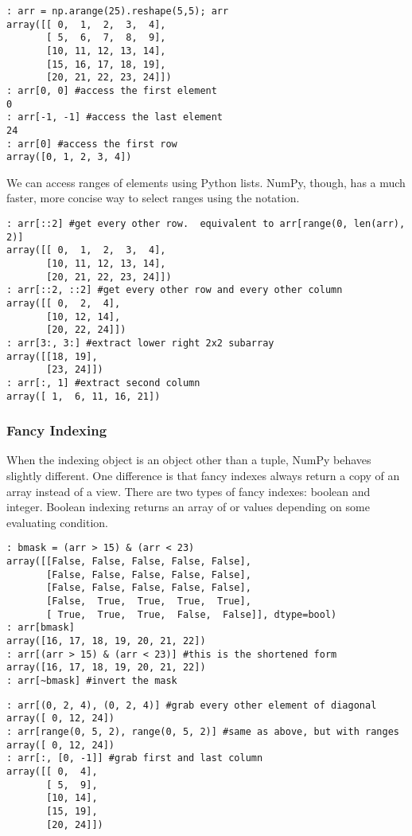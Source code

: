\begin{lstlisting}
: arr = np.arange(25).reshape(5,5); arr
array([[ 0,  1,  2,  3,  4],
       [ 5,  6,  7,  8,  9],
       [10, 11, 12, 13, 14],
       [15, 16, 17, 18, 19],
       [20, 21, 22, 23, 24]])
: arr[0, 0] #access the first element
0
: arr[-1, -1] #access the last element
24
: arr[0] #access the first row
array([0, 1, 2, 3, 4])
\end{lstlisting}
We can access ranges of elements using Python lists.  NumPy, though, has a much faster, more concise way to select ranges using the  notation.

\begin{lstlisting}
: arr[::2] #get every other row.  equivalent to arr[range(0, len(arr), 2)]
array([[ 0,  1,  2,  3,  4],
       [10, 11, 12, 13, 14],
       [20, 21, 22, 23, 24]])
: arr[::2, ::2] #get every other row and every other column
array([[ 0,  2,  4],
       [10, 12, 14],
       [20, 22, 24]])
: arr[3:, 3:] #extract lower right 2x2 subarray
array([[18, 19],
       [23, 24]])
: arr[:, 1] #extract second column
array([ 1,  6, 11, 16, 21])
\end{lstlisting}

\subsubsection*{Fancy Indexing}
When the indexing object is an object other than a tuple, NumPy behaves slightly different.  One difference is that fancy indexes always return a copy of an array instead of a view.  There are two types of fancy indexes: boolean and integer.  Boolean indexing returns an array of  or  values depending on some evaluating condition.

\begin{lstlisting}
: bmask = (arr > 15) & (arr < 23)
array([[False, False, False, False, False],
       [False, False, False, False, False],
       [False, False, False, False, False],
       [False,  True,  True,  True,  True],
       [ True,  True,  True,  False,  False]], dtype=bool)
: arr[bmask]
array([16, 17, 18, 19, 20, 21, 22])
: arr[(arr > 15) & (arr < 23)] #this is the shortened form
array([16, 17, 18, 19, 20, 21, 22])
: arr[~bmask] #invert the mask
\end{lstlisting}

\begin{lstlisting}
: arr[(0, 2, 4), (0, 2, 4)] #grab every other element of diagonal
array([ 0, 12, 24])
: arr[range(0, 5, 2), range(0, 5, 2)] #same as above, but with ranges
array([ 0, 12, 24])
: arr[:, [0, -1]] #grab first and last column
array([[ 0,  4],
       [ 5,  9],
       [10, 14],
       [15, 19],
       [20, 24]])
\end{lstlisting}

